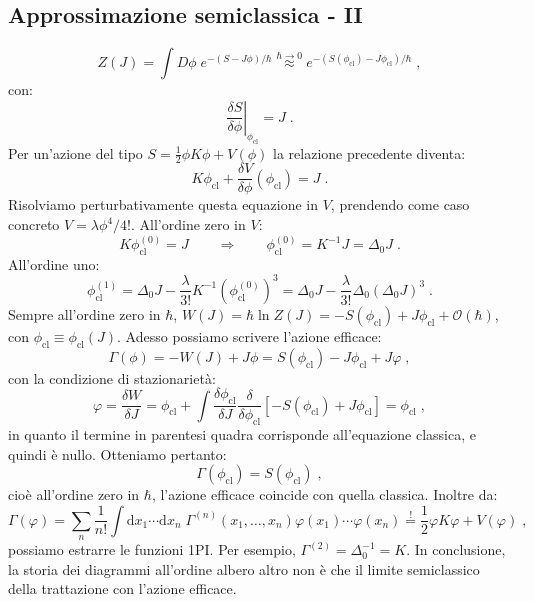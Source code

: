 \documentclass[12pt,a4paper]{article}
\theoremstyle{definition}
\numberwithin{equation}{section}
\newcommand{\diff}[1][]{\mathrm{d}#1}
\begin{document}
\subsection{Approssimazione semiclassica - II}
$$
Z(J)=\int D\phi\; e^{-(S-J\phi)/\hbar}\stackrel{\hbar\to 0}{\approx}e^{-(S(\phi_{\mathrm{cl}})-J\phi_{\mathrm{cl}})/\hbar}\;,
$$
con:
$$
\left.\frac{\delta S}{\delta\phi}\right|_{\phi_{\mathrm{cl}}}=J\;.
$$
Per un'azione del tipo $S=\frac{1}{2}\phi K\phi+V(\phi)$ la relazione precedente diventa:
\begin{equation}
K\phi_{\mathrm{cl}}+\frac{\delta V}{\delta\phi}(\phi_{\mathrm{cl}})=J\;.
\end{equation}
Risolviamo perturbativamente questa equazione in $V$, prendendo come caso concreto $V=\lambda\phi^4/4!$. All'ordine zero in $V$:
\begin{equation}
K\phi_{\mathrm{cl}}^{(0)}=J\qquad \Longrightarrow\qquad \phi_{\mathrm{cl}}^{(0)}=K^{-1}J=\Delta_0J\;.
\end{equation}
All'ordine uno:
\begin{equation}
\phi_{\mathrm{cl}}^{(1)}=\Delta_0J-\frac{\lambda}{3!}K^{-1}(\phi_{\mathrm{cl}}^{(0)})^3=\Delta_0J-\frac{\lambda}{3!}\Delta_0(\Delta_0J)^3\;.
\end{equation}
Sempre all'ordine zero in $\hbar$, $W(J)=\hbar\ln Z(J)=-S(\phi_{\mathrm{cl}})+J\phi_{\mathrm{cl}}+\mathcal{O}(\hbar)$, con $\phi_{\mathrm{cl}}\equiv \phi_{\mathrm{cl}}(J)$. Adesso possiamo scrivere l'azione efficace:
\begin{equation}
\Gamma(\phi)=-W(J)+J\phi=S(\phi_{\mathrm{cl}})-J\phi_{\mathrm{cl}}+J\varphi\;,
\end{equation}
con la condizione di stazionarietà:
\begin{equation}
\varphi=\frac{\delta W}{\delta J}=\phi_{\mathrm{cl}}+\int \frac{\delta\phi_{\mathrm{cl}}}{\delta J}\frac{\delta}{\delta\phi_{\mathrm{cl}}}[-S(\phi_{\mathrm{cl}})+J\phi_{\mathrm{cl}}]=\phi_{\mathrm{cl}}\;,
\end{equation}
in quanto il termine in parentesi quadra corrisponde all'equazione classica, e quindi è nullo. Otteniamo pertanto:
\begin{equation}
\Gamma(\phi_{\mathrm{cl}})=S(\phi_{\mathrm{cl}})\;,
\end{equation}
cioè all'ordine zero in $\hbar$, l'azione efficace coincide con quella classica. Inoltre da:
\begin{equation}
\Gamma(\varphi)=\sum_n\frac{1}{n!}\int\diff{x_1}\cdots\diff{x_n}\;\Gamma^{(n)}(x_1,\ldots,x_n)\varphi(x_1)\cdots\varphi(x_n)\stackrel{!}{=}\frac{1}{2}\varphi K\varphi+V(\varphi)\;,
\end{equation}
possiamo estrarre le funzioni 1PI. Per esempio, $\Gamma^{(2)}=\Delta_0^{-1}=K$. In conclusione, la storia dei diagrammi all'ordine albero altro non è che il limite semiclassico della trattazione con l'azione efficace.
\end{document}
